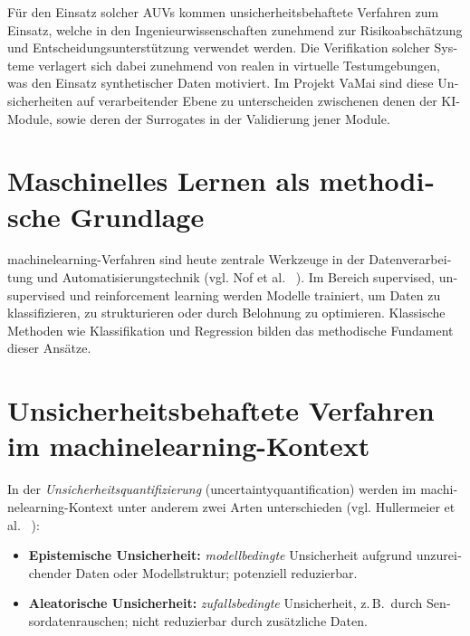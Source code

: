 \begin{otherlanguage}{ngerman}
Für den Einsatz solcher AUVs kommen unsicherheitsbehaftete Verfahren zum Einsatz, welche in den Ingenieurwissenschaften zunehmend zur Risikoabschätzung und Entscheidungsunterstützung verwendet werden. Die Verifikation solcher Systeme verlagert sich dabei zunehmend von realen in virtuelle Testumgebungen, was den Einsatz synthetischer Daten motiviert. Im Projekt VaMai sind diese Unsicherheiten auf verarbeitender Ebene zu unterscheiden zwischenen denen der KI-Module, sowie deren der Surrogates in der Validierung jener Module.


\section{Maschinelles Lernen als methodische Grundlage}

\gls{machinelearning}-Verfahren sind heute zentrale Werkzeuge in der Datenverarbeitung und Automatisierungstechnik (vgl. Nof et al. ~\parencite{Nof2023}). Im Bereich \glqq supervised\grqq, \glqq unsupervised\grqq{} und \glqq reinforcement learning\grqq{} werden Modelle trainiert, um Daten zu klassifizieren, zu strukturieren oder durch Belohnung zu optimieren. Klassische Methoden wie Klassifikation und Regression bilden das methodische Fundament dieser Ansätze.

\section{Unsicherheitsbehaftete Verfahren im \gls{machinelearning}-Kontext}

In der \textit{Unsicherheitsquantifizierung} (\gls{uncertaintyquantification}) werden im \gls{machinelearning}-Kontext unter anderem zwei Arten unterschieden (vgl. Hullermeier et al. ~\parencite[{S.458, \glqq Sources of uncertainty in supervised learning\grqq{}, \gls{Aleatorische Unsicherheit} Z.23-27, \gls{Epistemische Unsicherheit} Z.23-25}]{Hullermeier2021}):

\begin{itemize}
  \item \textbf{\gls{Epistemische Unsicherheit}:} \textit{modellbedingte} Unsicherheit aufgrund unzureichender Daten oder Modellstruktur; potenziell reduzierbar.
  \item \textbf{\gls{Aleatorische Unsicherheit}:} \textit{zufallsbedingte} Unsicherheit, z.\,B.\ durch Sensordatenrauschen; nicht reduzierbar durch zusätzliche Daten.
\end{itemize}


\end{otherlanguage}
